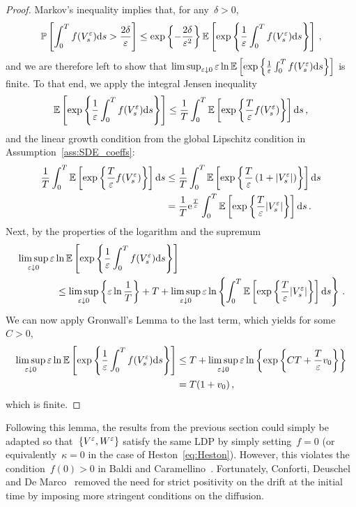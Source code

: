 \begin{proof}
Markov's inequality implies that, for any~$\delta>0$,
\[
\mathbb{P}\left[ \int_0^T f(V_s^\varepsilon)\mathrm{d} s > \frac{2\delta}{\varepsilon} \right] \leq \exp\left\{ -\frac{2\delta}{\varepsilon^2}\right\}\mathbb{E}\left[ \exp\left\{ \frac 1{\varepsilon} \int_0^T f(V_s^\varepsilon)\mathrm{d} s \right\} \right]\,,
\]
and we are therefore left to show that 
$\limsup_{\varepsilon\downarrow 0}\varepsilon\ln\mathbb{E}\left[ \exp\left\{ \frac 1{\varepsilon} \int_0^T f(V_s^\varepsilon)\mathrm{d} s \right\} \right]$
is finite.
To that end, we apply the integral Jensen inequality
\[
\mathbb{E}\left[ \exp\left\{ \frac 1{\varepsilon} \int_0^T f(V_s^\varepsilon)\mathrm{d} s \right\} \right] \leq \frac{1}{T} \int_0^T \mathbb{E}\left[ \exp\left\{ \frac{T}{\varepsilon} f(V_s^\varepsilon) \right\} \right] \mathrm{d} s\,,
\]
and the linear growth condition from the global Lipschitz condition in Assumption~\ref{ass:SDE_coeffs}:
\begin{align*}
\frac{1}{T} \int_0^T \mathbb{E}\left[ \exp\left\{ \frac{T}{\varepsilon} f(V_s^\varepsilon) \right\} \right] \mathrm{d} s &\leq \frac{1}{T} \int_0^T \mathbb{E}\left[ \exp\left\{ \frac{T}{\varepsilon}\left(1 + |V_s^\varepsilon| \right) \right\} \right] \mathrm{d} s \\
&= \frac{1}{T}\mathrm{e}^{\frac{T}{\varepsilon}} \int_0^T \mathbb{E}\left[ \exp\left\{ \frac{T}{\varepsilon} |V_s^\varepsilon| \right\} \right] \mathrm{d} s\,.
\end{align*}
Next, by the properties of the logarithm and the supremum
\begin{align*}
& \limsup_{\varepsilon\downarrow 0}\varepsilon\ln\mathbb{E}\left[ \exp\left\{ \frac 1{\varepsilon} \int_0^T f(V_s^\varepsilon)\mathrm{d} s \right\} \right] \\ & \qquad \qquad \leq \limsup_{\varepsilon\downarrow 0}\left\{\varepsilon\ln\frac1T\right\} + T + \limsup_{\varepsilon\downarrow 0}\varepsilon\ln\left\{\int_0^T  \mathbb{E}\left[ \exp\left\{ \frac{T}{\varepsilon} |V_s^\varepsilon| \right\} \right] \mathrm{d} s\right\}\,.
\end{align*}
We can now apply Gronwall's Lemma to the last term, which yields for some~$C>0$,
\begin{align*}
    \limsup_{\varepsilon\downarrow 0}\varepsilon\ln\mathbb{E}\left[ \exp\left\{ \frac 1{\varepsilon} \int_0^T f(V_s^\varepsilon)\mathrm{d} s \right\} \right]
    &\leq T + \limsup_{\varepsilon\downarrow 0}\varepsilon\ln\left\{ \exp\left\{ CT + \frac{T}{\varepsilon} v_0 \right\} \right\} \\
    &= T(1+v_0)\,,
\end{align*}
which is finite.
\end{proof}
Following this lemma, the results from the previous section could simply be adapted so that~$\{V^\varepsilon, W^{\varepsilon}\}$ satisfy the same LDP by simply setting~$f=0$ (or equivalently~$\kappa = 0$ in the case of Heston~\eqref{eq:Heston}). However, this violates the condition~$f(0)>0$ in Baldi and Caramellino~\cite{Baldi2011GeneralDiffusions}. Fortunately, Conforti, Deuschel and De Marco~\cite{Conforti2015OnModels} removed the need for strict positivity on the drift at the initial time by imposing more stringent conditions on the diffusion.
